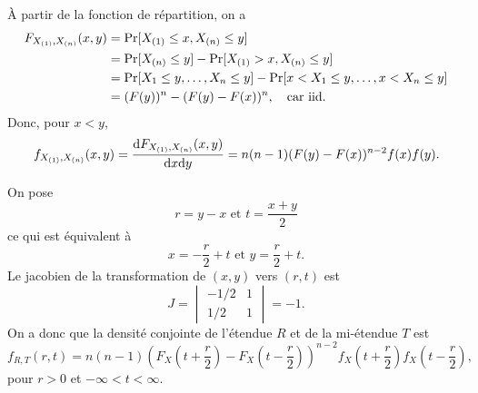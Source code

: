 \begin{solution}{1.16}
À partir de la fonction de répartition, on a
\begin{align*}
F_{X_{(1)}, X_{(n)}}(x,y)&= \mathrm{Pr} [ X_{(1)} \leq x, X_{(n)} \leq y ] \\
&= \mathrm{Pr} [ X_{(n)} \leq y ] - \mathrm{Pr} [ X_{(1)} > x, X_{(n)} \leq y ] \\
&= \mathrm{Pr} [ X_1 \leq y, \dots, X_n \leq y ] - \mathrm{Pr} [ x < X_1 \leq y, \dots, x < X_n \leq y ] \\
&= (F(y))^n - (F(y)-F(x))^n, \quad \text{car iid.}
\end{align*}
Donc, pour $x < y$,
$$
f_{X_{(1)}, X_{(n)}}(x,y) = \frac{\mbox{d} F_{X_{(1)}, X_{(n)}}(x,y)}{\mbox{d} x \mbox{d} y} = n (n - 1) (F(y) - F(x))^{n - 2}  f(x) f(y).
$$
\end{solution}
\begin{solution}{1.17}
On pose
$$
r = y - x \mbox{  et } t= \frac{x + y}{2}
$$
ce qui est équivalent à
$$
    x = -\frac{r}{2} + t \mbox{  et }
    y = \frac{r}{2} + t.
$$
Le jacobien de la transformation de $(x, y)$ vers $(r, t)$ est
\begin{equation*}
  J =  \begin{vmatrix}
    -1/2 & 1 \\
    1/2  & 1
  \end{vmatrix}
  = -1.
\end{equation*}
On a donc que la densité conjointe de l'étendue $R$ et de la mi-étendue $T$ est
 \begin{displaymath}
    f_{R, T}(r, t) = n (n - 1)
    \left(
      F_X\left(t + \frac{r}{2}\right) -
      F_X\left(t - \frac{r}{2}\right)
    \right)^{n - 2}
    f_X\left(t + \frac{r}{2}\right)
    f_X\left(t - \frac{r}{2}\right),
  \end{displaymath}
  pour $r > 0$ et $-\infty < t < \infty$.
%
\end{solution}
